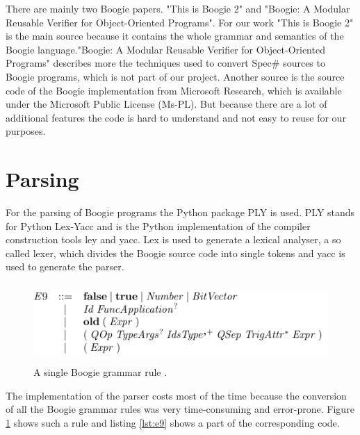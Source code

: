 \documentclass[paper=a4, fontsize=12pt]{scrartcl}
\begin{document}
There are mainly two Boogie papers. "This is Boogie 2"\cite{boogie2} and "Boogie: A Modular Reusable Verifier for Object-Oriented Programs"\cite{boogie}. For our work "This is Boogie 2" is the main source because it contains the whole grammar and semantics of the Boogie language."Boogie: A Modular Reusable Verifier for Object-Oriented Programs" describes more the techniques used to convert Spec\# sources to Boogie programs, which is not part of our project. Another source is the source code of the Boogie implementation from Microsoft Research, which is available under the Microsoft Public License (Ms-PL). But because there are a lot of additional features the code is hard to understand and not easy to reuse for our purposes.

\section{Parsing}
For the parsing of Boogie programs the Python package PLY is used. PLY stands for Python Lex-Yacc and is the Python implementation of the compiler construction tools ley and yacc. Lex is used to generate a lexical analyser, a so called lexer, which divides the Boogie source code into single tokens and yacc is used to generate the parser. 

\begin{figure}[ht]
  \centering
    \includegraphics[height=3cm]{e9}
    \caption{A single Boogie grammar rule \cite{boogie2}.}
  \label{fig:e9}
\end{figure}

The implementation of the parser costs most of the time because the conversion of all the Boogie grammar rules was very time-consuming and error-prone. Figure \ref{fig:e9} shows such a rule and listing \ref{lst:e9} shows a part of the corresponding code.
\end{document}
